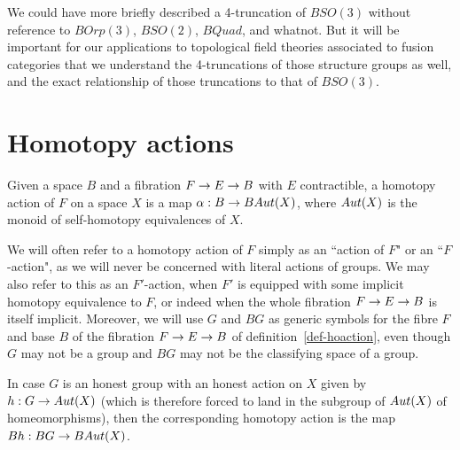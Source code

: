 \documentclass{amsart}
\begin{document}
\begin{remark}
We could have more briefly described a 4-truncation of $BSO(3)$ without reference to $BOrp(3)$, $BSO(2)$, $BQuad$, and whatnot.  But it will be important for our applications to topological field theories associated to fusion categories that we understand the 4-truncations of those structure groups as well, and the exact relationship of those truncations to that of $BSO(3)$.
\end{remark}


\section{Homotopy actions}


\begin{definition} \label{def-hoaction}
Given a space $B$ and a fibration $F \rightarrow E \rightarrow B$ with $E$ contractible, a homotopy action of $F$ on a space $X$ is a map $\alpha: B \rightarrow BAut(X)$, where $Aut(X)$ is the monoid of self-homotopy equivalences of $X$.
\end{definition}
\nid We will often refer to a homotopy action of $F$ simply as an ``action of $F$" or an ``$F$-action", as we will never be concerned with literal actions of groups.  We may also refer to this as an $F'$-action, when $F'$ is equipped with some implicit homotopy equivalence to $F$, or indeed when the whole fibration $F \rightarrow E \rightarrow B$ is itself implicit.  Moreover, we will use $G$ and $BG$ as generic symbols for the fibre $F$ and base $B$ of the fibration $F \rightarrow E \rightarrow B$ of definition~\ref{def-hoaction}, even though $G$ may not be a group and $BG$ may not be the classifying space of a group.

In case $G$ is an honest group with an honest action on $X$ given by $h: G \rightarrow Aut(X)$ (which is therefore forced to land in the subgroup of $Aut(X)$ of homeomorphisms), then the corresponding homotopy action is the map $Bh: BG \rightarrow BAut(X)$.
\end{document}
